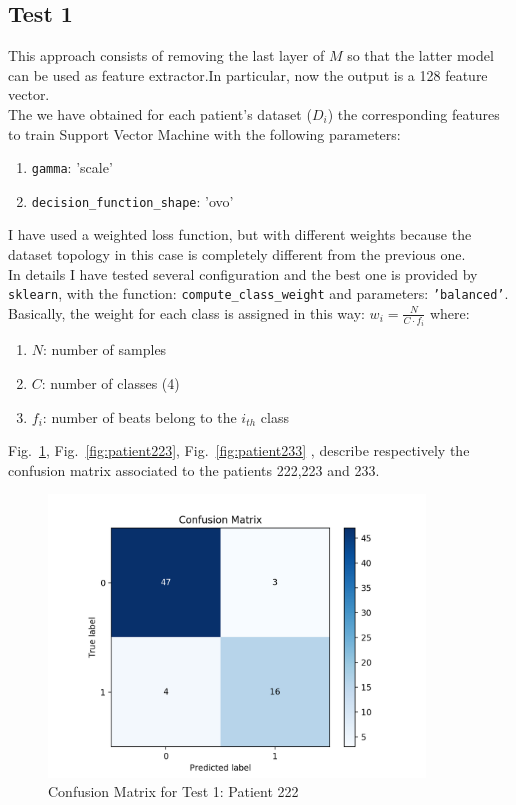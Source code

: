 \documentclass[LaM,binding=0.6cm]{sapthesis}
\begin{document}
\subsection{Test 1}
This approach consists of removing the last layer of $M$ so that the latter model can be used as feature extractor.In particular, now the output is a 128 feature vector.\\The we have obtained for each patient's dataset ($D_i$) the corresponding features to train Support Vector Machine with the following parameters:
\begin{enumerate}
\item \texttt{gamma}: 'scale'
\item \texttt{decision\_function\_shape}: 'ovo'
\end{enumerate}
I have used a weighted loss function, but with different weights because the dataset topology in this case is completely different from the previous one.\\In details I have tested several configuration and the best one is provided by \texttt{sklearn}, with the function: \texttt{compute\_class\_weight} and parameters: \texttt{'balanced'}.\\Basically, the weight for each class is assigned in this way: $w_i = \frac{N}{C\cdot f_i}$ where:
\begin{enumerate}
\item $N$: number of samples
\item $C$: number of classes (4)
\item $f_i$: number of beats belong to the $i_{th}$ class
\end{enumerate}
Fig.~\ref{fig:patient222}, Fig.~\ref{fig:patient223}, Fig.~\ref{fig:patient233} , describe respectively the confusion matrix associated to the patients 222,223 and 233.
\begin{figure}[H]  \centering
	\includegraphics[width=100mm,scale=0.7]{patient222}
	\caption{Confusion Matrix for Test 1: Patient 222 }
	\label{fig:patient222}
\end{figure}
\end{document}

